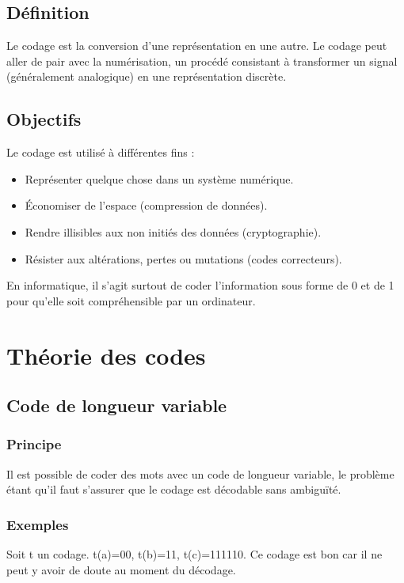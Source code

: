 \documentclass[a4paper,10pt]{book}
\begin{document}
\subsection{Définition}
Le codage est la conversion d'une représentation en une autre. Le codage peut aller de pair avec la numérisation, un procédé consistant à transformer un signal (généralement analogique) en une représentation discrète.

\subsection{Objectifs}
Le codage est utilisé à différentes fins :\\ \begin{itemize}
\item Représenter quelque chose dans un système numérique.
\item Économiser de l’espace (compression de données).
\item Rendre illisibles aux non initiés des données (cryptographie).
\item Résister aux altérations, pertes ou mutations (codes correcteurs).\\ \end{itemize}

En informatique, il s'agit surtout de coder l'information sous forme de 0 et de 1 pour qu'elle soit compréhensible par un ordinateur.

\newpage

\section{Théorie des codes}
\subsection{Code de longueur variable}
\subsubsection{Principe}
Il est possible de coder des mots avec un code de longueur variable, le problème étant qu'il faut s'assurer que le codage est décodable sans ambiguïté.

\subsubsection{Exemples}
Soit t un codage. t(a)=00, t(b)=11, t(c)=111110. Ce codage est bon car il ne peut y avoir de doute au moment du décodage.\\
\end{document}
